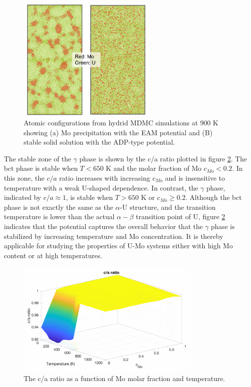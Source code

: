 \documentclass[review]{elsarticle}
\begin{document}
\begin{figure}[h!]
 \centering
 \includegraphics[width=0.6\textwidth]{Mo_precipitation.pdf} 
 \caption{Atomic configurations from hydrid MDMC simulations at 900 K showing (a) Mo precipitation with the EAM potential and (B) stable solid solution with the ADP-type potential. }
 \label{fig:Mo_precip}
\end{figure}

The stable zone of the $\gamma$ phase is shown by the c/a ratio plotted in figure \ref{fig:c_a_ratio}. The bct phase is stable when $T<650$ K and the molar fraction of Mo $c_{Mo}<0.2$. In this zone, the $c/a$ ratio increases with increasing $c_{Mo}$ and is insensitive to temperature with a weak U-shaped dependence. In contrast, the $\gamma$ phase, indicated by $c/a\approx1$, is stable when $T>650$ K or $c_{Mo}\geq0.2$. Although the bct phase is not exactly the same as the $\alpha$-U structure, and the transition temperature is lower than the actual $\alpha-\beta$ transition point of U, figure \ref{fig:c_a_ratio} indicates that the potential captures the overall behavior that the $\gamma$ phase is stabilized by increasing temperature and Mo concentration. It is thereby applicable for studying the properties of U-Mo systems either with high Mo content or at high temperatures. 

\begin{figure}[h!]
 \centering
 \includegraphics[width=0.8\textwidth]{c_a.pdf} 
 \caption{The c/a ratio as a function of Mo molar fraction and temperature. }
 \label{fig:c_a_ratio}
\end{figure}
\end{document}
